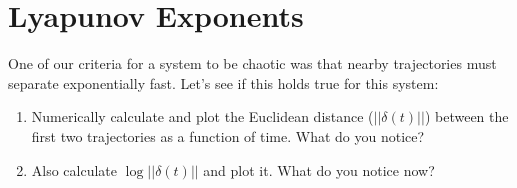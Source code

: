 \documentclass[letterpaper,10pt,english]{jupyterBook}
\begin{document}
\section{Lyapunov Exponents}
\label{\detokenize{content/1_mechanics/CHAOS:lyapunov-exponents}}
\sphinxAtStartPar
One of our criteria for a system to be chaotic was that nearby trajectories must separate exponentially fast. Let’s see if this holds true for this system:

\sphinxAtStartPar
{}
\begin{enumerate}
%
\item {} 
\sphinxAtStartPar
Numerically calculate and plot the Euclidean distance (\(||\delta(t)||\)) between the first two trajectories  as a function of time. What do you notice?

\item {} 
\sphinxAtStartPar
Also calculate  \(\log ||\delta(t)||\) and plot it. What do you notice now?

\end{enumerate}
\end{document}
